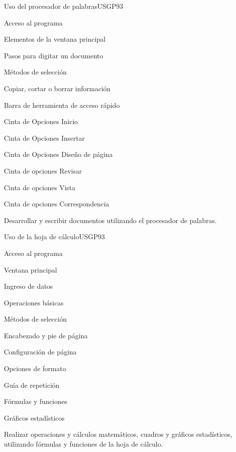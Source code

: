 \begin{syllabus}
\begin{unit}{Uso del procesador de palabras}{USGP}{9}{3}
\begin{topics}
      \item Acceso al programa
      \item Elementos de la ventana principal
      \item Pasos para digitar un documento
      \item Métodos de selección
      \item Copiar, cortar o borrar información
      \item Barra de herramienta de acceso rápido
      \item Cinta de Opciones Inicio
      \item Cinta de Opciones Insertar
      \item Cinta de Opciones Diseño de página
      \item Cinta de opciones Revisar
      \item Cinta de opciones Vista
      \item Cinta de opciones Correspondencia
\end{topics}
\begin{unitgoals}
   \item Desarrollar y escribir documentos utilizando el procesador de palabras.
\end{unitgoals}
\end{unit}

\begin{unit}{Uso de la hoja de cálculo}{USGP}{9}{3}
\begin{topics}
      \item Acceso al programa
      \item Ventana principal
      \item Ingreso de datos 
      \item Operaciones básicas 
      \item Métodos de selección 
      \item Encabezado y pie de página 
      \item Configuración de página 
      \item Opciones de formato 
      \item Guía de repetición
      \item Fórmulas y funciones 
      \item Gráficos estadísticos
\end{topics}
\begin{unitgoals}
   \item Realizar operaciones y cálculos matemáticos, cuadros y gráficos estadísticos, utilizando fórmulas y funciones de la hoja de cálculo.
\end{unitgoals}
\end{unit}


\end{syllabus}
